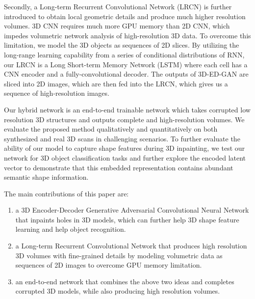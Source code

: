 \documentclass[10pt,twocolumn,letterpaper]{article}
\begin{document}
Secondly, a Long-term Recurrent Convolutional Network (LRCN) is further introduced to obtain local geometric details and produce much higher resolution volumes. 3D CNN requires much more GPU memory than 2D CNN, which impedes volumetric network analysis of high-resolution 3D data. To overcome this limitation, we model the 3D objects as sequences of 2D slices. By utilizing the long-range learning capability from a series of conditional distributions of RNN, our LRCN is a Long Short-term Memory Network (LSTM) where each cell has a CNN encoder and a fully-convolutional decoder. The outputs of 3D-ED-GAN are sliced into 2D images, which are then fed into the LRCN, which gives us a sequence of high-resolution images.

Our hybrid network is an end-to-end trainable network which takes corrupted low resolution 3D structures and outputs complete and high-resolution volumes. We evaluate the proposed method qualitatively and quantitatively on both synthesized and real 3D scans in challenging scenarios. To further evaluate the ability of our model to capture shape features during 3D inpainting, we test our network for 3D object classification tasks and further explore the encoded latent vector to demonstrate that this embedded representation contains abundant semantic shape information. 

The main contributions of this paper are:
\begin{enumerate}
\item a 3D Encoder-Decoder Generative Adversarial Convolutional Neural Network that inpaints holes in 3D models, which can further help 3D shape feature learning and help object recognition.
\item a Long-term Recurrent Convolutional Network that produces high resolution 3D volumes with fine-grained details by modeling volumetric data as sequences of 2D images to overcome GPU memory limitation.
\item an end-to-end network that combines the above two ideas and completes corrupted 3D models, while also producing high resolution volumes. 
\end{enumerate}




\end{document}
